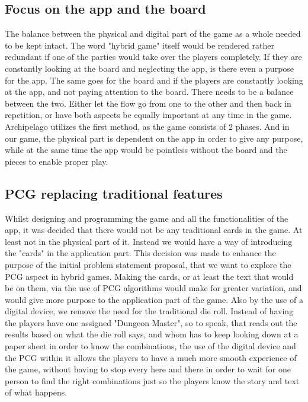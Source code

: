 \subsection{Focus on the app and the board}
The balance between the physical and digital part of the game as a whole needed to be kept intact. The word "hybrid game" itself would be rendered rather redundant if one of the parties would take over the players completely. If they are constantly looking at the board and neglecting the app, is there even a purpose for the app. The same goes for the board and if the players are constantly looking at the app, and not paying attention to the board. There needs to be a balance between the two. Either let the flow go from one to the other and then back in repetition, or have both aspects be equally important at any time in the game. Archipelago utilizes the first method, as the game consists of 2 phases. And in our game, the physical part is dependent on the app in order to give any purpose, while at the same time the app would be pointless without the board and the pieces to enable proper play.

\subsection{PCG replacing traditional features}
Whilst designing and programming the game and all the functionalities of the app, it was decided that there would not be any traditional cards in the game. At least not in the physical part of it. Instead we would have a way of introducing the "cards" in the application part. This decision was made to enhance the purpose of the initial problem statement proposal, that we want to explore the PCG aspect in hybrid games. Making the cards, or at least the text that would be on them, via the use of PCG algorithms would make for greater variation, and would give more purpose to the application part of the game. Also by the use of a digital device, we remove the need for the traditional die roll. Instead of having the players have one assigned "Dungeon Master", so to speak, that reads out the results based on what the die roll says, and whom has to keep looking down at a paper sheet in order to know the combinations, the use of the digital device and the PCG within it allows the players to have a much more smooth experience of the game, without having to stop every here and there in order to wait for one person to find the right combinations just so the players know the story and text of what happens.
